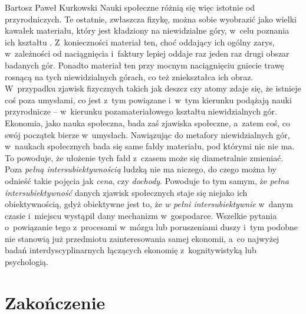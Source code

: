 \begin{artplenv}{Bartosz Paweł Kurkowski}
Nauki społeczne różnią się więc istotnie od przyrodniczych. Te ostatnie, zwłaszcza fizykę, można sobie wyobrazić jako
wielki kawałek materiału, który jest kładziony na niewidzialne góry, w~celu poznania ich kształtu
\parencite[s.~127]{grobler_prawda_2000}.
Z~konieczności materiał ten, choć oddający ich ogólny
zarys, w~zależności od naciągnięcia i~faktury lepiej oddaje raz jeden raz drugi obszar badanych gór. Ponadto materiał ten przy
mocnym naciągnięciu gniecie trawę rosnącą na tych niewidzialnych górach, co też zniekształca ich obraz. W~przypadku
zjawisk fizycznych takich jak deszcz czy atomy zdaje się, że istnieje coś poza umysłami, co jest z~tym
powiązane i~w~tym kierunku podążają nauki przyrodnicze -- w~kierunku pozamateriałowego kształtu niewidzialnych gór. Ekonomia, jako
nauka społeczna, bada zaś zjawiska społeczne, a~zatem coś, co swój początek bierze w~umysłach. Nawiązując do metafory
niewidzialnych gór, w~naukach społecznych bada się same fałdy materiału, pod którymi nic nie ma. To powoduje, że
ułożenie tych fałd z~czasem może się diametralnie zmieniać. Poza \textit{pełną intersubiektywnością} ludzką nie ma
niczego, do czego można by odnieść takie pojęcia jak \textit{cena}, czy \textit{dochody}. Powoduje to tym samym, że
\textit{pełna intersubiektywność} danych zjawisk społecznych staje się niejako ich obiektywnością, gdyż obiektywne jest
to, że \textit{w pełni intersubiektywnie} w~danym czasie i~miejscu wystąpił dany mechanizm w~gospodarce. Wszelkie
pytania o~powiązanie tego z~procesami w~mózgu lub poruszeniami duszy i~tym podobne nie stanowią już przedmiotu
zainteresowania samej ekonomii, a~co najwyżej badań interdyscyplinarnych łączących ekonomię z~kognitywistyką lub
psychologią.

\section*{Zakończenie}


\end{artplenv}

